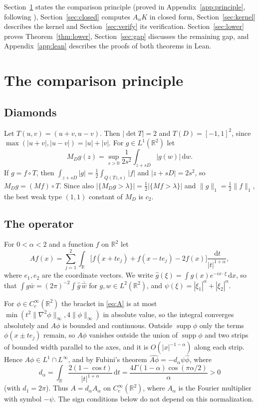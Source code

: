 \documentclass[11pt]{amsart}
\theoremstyle{definition}
\theoremstyle{remark}
\numberwithin{equation}{section}
\newcommand{\R}{\mathbb{R}}
\newcommand{\dd}{\,\mathrm{d}}
\newcommand{\supp}{\operatorname{supp}}
\newcommand{\Cc}{C_c^\infty}
\begin{document}
Section~\ref{sec:principle} states the comparison principle (proved in Appendix~\ref{app:principle}, following \cite{Lin26a}), Section~\ref{sec:closed} computes $A_\alpha K$ in closed form, Section~\ref{sec:kernel} describes the kernel and Section~\ref{sec:verify} its verification. Section~\ref{sec:lower} proves Theorem~\ref{thm:lower}, Section~\ref{sec:gap} discusses the remaining gap, and Appendix~\ref{app:lean} describes the proofs of both theorems in Lean.

\section{The comparison principle}\label{sec:principle}

\subsection{Diamonds} Let $T(u,v)=(u+v,u-v)$. Then $|\det T|=2$ and $T(D)=[-1,1]^2$, since $\max(|u+v|,|u-v|)=|u|+|v|$. For $g\in L^1(\R^2)$ let
\[
M_Dg(z)=\sup_{s>0}\frac{1}{2s^2}\int_{z+sD}|g(w)|\dd w .
\]
If $g=f\circ T$, then $\int_{z+sD}|g|=\frac12\int_{Q(Tz,s)}|f|$ and $|z+sD|=2s^2$, so $M_Dg=(Mf)\circ T$. Since also $|\{M_Dg>\lambda\}|=\frac12|\{Mf>\lambda\}|$ and $\|g\|_1=\frac12\|f\|_1$, the best weak type $(1,1)$ constant of $M_D$ is $c_2$.

\subsection{The operator} For $0<\alpha<2$ and a function $f$ on $\R^2$ let
\begin{equation}\label{eq:A}
Af(x)=\sum_{j=1}^2\int_{\R}\bigl[f(x+te_j)+f(x-te_j)-2f(x)\bigr]\frac{\dd t}{|t|^{1+\alpha}},
\end{equation}
where $e_1,e_2$ are the coordinate vectors. We write $\hat g(\xi)=\int g(x)e^{-ix\cdot\xi}\dd x$, so that $\int g\bar w=(2\pi)^{-2}\int\hat g\,\overline{\hat w}$ for $g,w\in L^2(\R^2)$, and $\psi(\xi)=|\xi_1|^\alpha+|\xi_2|^\alpha$.

For $\phi\in\Cc(\R^2)$ the bracket in \eqref{eq:A} is at most $\min(t^2\|\nabla^2\phi\|_\infty,4\|\phi\|_\infty)$ in absolute value, so the integral converges absolutely and $A\phi$ is bounded and continuous. Outside $\supp\phi$ only the terms $\phi(x\pm te_j)$ remain, so $A\phi$ vanishes outside the union of $\supp\phi$ and two strips of bounded width parallel to the axes, and it is $O(|x|^{-1-\alpha})$ along each strip. Hence $A\phi\in L^1\cap L^\infty$, and by Fubini's theorem $\widehat{A\phi}=-d_\alpha\psi\hat\phi$, where
\[
d_\alpha=\int_{\R}\frac{2(1-\cos t)}{|t|^{1+\alpha}}\dd t=\frac{4\Gamma(1-\alpha)\cos(\pi\alpha/2)}{\alpha}>0
\]
(with $d_1=2\pi$). Thus $A=d_\alpha A_\alpha$ on $\Cc(\R^2)$, where $A_\alpha$ is the Fourier multiplier with symbol $-\psi$. The sign conditions below do not depend on this normalization.
\end{document}
